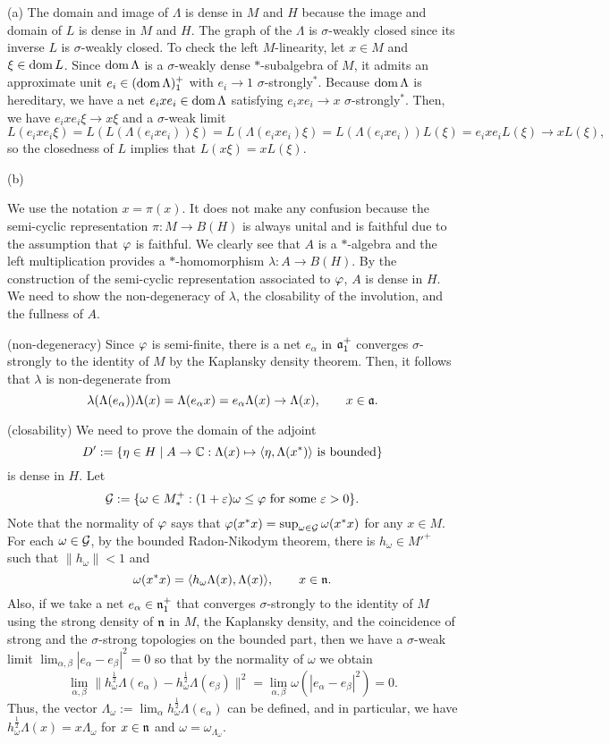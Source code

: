 \documentclass{../../large}
\begin{document}
\begin{pf}
(a)
The domain and image of $\Lambda$ is dense in $M$ and $H$ because the image and domain of $L$ is dense in $M$ and $H$.
The graph of the $\Lambda$ is $\sigma$-weakly closed since its inverse $L$ is $\sigma$-weakly closed.
To check the left $M$-linearity, let $x\in M$ and $\xi\in\operatorname{dom} L$.
Since $\operatorname{dom}\Lambda$ is a $\sigma$-weakly dense $*$-subalgebra of $M$, it admits an approximate unit $e_i\in(\operatorname{dom}\Lambda)_1^+$ with $e_i\to1$ $\sigma$-strongly$^*$.
Because $\operatorname{dom}\Lambda$ is hereditary, we have a net $e_ixe_i\in\operatorname{dom}\Lambda$ satisfying $e_ixe_i\to x$ $\sigma$-strongly$^*$.
Then, we have $e_ixe_i\xi\to x\xi$ and a $\sigma$-weak limit
\[L(e_ixe_i\xi)=L(L(\Lambda(e_ixe_i))\xi)=L(\Lambda(e_ixe_i)\xi)=L(\Lambda(e_ixe_i))L(\xi)=e_ixe_iL(\xi)\to xL(\xi),\]
so the closedness of $L$ implies that $L(x\xi)=xL(\xi)$.

(b)

We use the notation $x=\pi(x)$.
It does not make any confusion because the semi-cyclic representation $\pi:M\to B(H)$ is always unital and is faithful due to the assumption that $\varphi$ is faithful.
We clearly see that $A$ is a $*$-algebra and the left multiplication provides a $*$-homomorphism $\lambda:A\to B(H)$.
By the construction of the semi-cyclic representation associated to $\varphi$, $A$ is dense in $H$.
We need to show the non-degeneracy of $\lambda$, the closability of the involution, and the fullness of $A$.

(non-degeneracy)
Since $\varphi$ is semi-finite, there is a net $e_\alpha$ in $\mathfrak{a}_1^+$ converges $\sigma$-strongly to the identity of $M$ by the Kaplansky density theorem.
Then, it follows that $\lambda$ is non-degenerate from
\[\lambda(\Lambda(e_\alpha))\Lambda(x)=\Lambda(e_\alpha x)=e_\alpha\Lambda(x)\to\Lambda(x),\qquad x\in\mathfrak{a}.\]

(closability)
We need to prove the domain of the adjoint
\[D':=\{\eta\in H\mid A\to\mathbb{C}:\Lambda(x)\mapsto\langle\eta,\Lambda(x^*)\rangle\text{ is bounded}\}\]
is dense in $H$.
Let
\[\mathcal{G}:=\{\omega\in M_*^+:(1+\varepsilon)\omega\le\varphi\text{ for some }\varepsilon>0\}.\]
Note that the normality of $\varphi$ says that $\varphi(x^*x)=\sup_{\omega\in\mathcal{G}}\omega(x^*x)$ for any $x\in M$.
For each $\omega\in\mathcal{G}$, by the bounded Radon-Nikodym theorem, there is $h_\omega\in M'^+$ such that $\|h_\omega\|<1$ and
\[\omega(x^*x)=\langle h_\omega\Lambda(x),\Lambda(x)\rangle,\qquad x\in\mathfrak{n}.\]
Also, if we take a net $e_\alpha\in\mathfrak{n}_1^+$ that converges $\sigma$-strongly to the identity of $M$ using the strong density of $\mathfrak{n}$ in $M$, the Kaplansky density, and the coincidence of strong and the $\sigma$-strong topologies on the bounded part, then we have a $\sigma$-weak limit $\lim_{\alpha,\beta}|e_\alpha-e_\beta|^2=0$ so that by the normality of $\omega$ we obtain
\[\lim_{\alpha,\beta}\|h_\omega^{\frac12}\Lambda(e_\alpha)-h_\omega^{\frac12}\Lambda(e_\beta)\|^2=\lim_{\alpha,\beta}\omega(|e_\alpha-e_\beta|^2)=0.\]
Thus, the vector $\Lambda_\omega:=\lim_\alpha h_\omega^{\frac12}\Lambda(e_\alpha)$ can be defined, and in particular, we have $h_\omega^{\frac12}\Lambda(x)=x\Lambda_\omega$ for $x\in\mathfrak{n}$ and $\omega=\omega_{\Lambda_\omega}$.


\end{pf}
\end{document}
